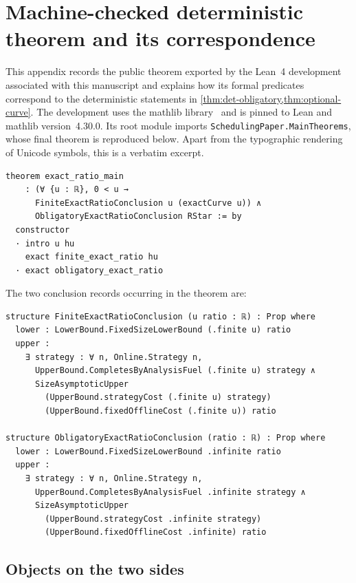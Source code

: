 \section{Machine-checked deterministic theorem and its correspondence}
\label{app:lean-formalization}

This appendix records the public theorem exported by the Lean~4
development~\cite{DeMouraUllrich2021} associated with this manuscript and
explains how its formal predicates correspond to the deterministic statements
in \cref{thm:det-obligatory,thm:optional-curve}.  The development uses the
mathlib library~\cite{Mathlib2020} and is pinned to Lean and mathlib
version~4.30.0.  Its root module imports
\texttt{SchedulingPaper.MainTheorems}, whose final theorem is reproduced
below.  Apart from the typographic rendering of Unicode symbols, this is a
verbatim excerpt.

\begin{lstlisting}[style=lean]
theorem exact_ratio_main
    : (∀ {u : ℝ}, 0 < u →
      FiniteExactRatioConclusion u (exactCurve u)) ∧
      ObligatoryExactRatioConclusion RStar := by
  constructor
  · intro u hu
    exact finite_exact_ratio hu
  · exact obligatory_exact_ratio
\end{lstlisting}

The two conclusion records occurring in the theorem are:

\begin{lstlisting}[style=lean]
structure FiniteExactRatioConclusion (u ratio : ℝ) : Prop where
  lower : LowerBound.FixedSizeLowerBound (.finite u) ratio
  upper :
    ∃ strategy : ∀ n, Online.Strategy n,
      UpperBound.CompletesByAnalysisFuel (.finite u) strategy ∧
      SizeAsymptoticUpper
        (UpperBound.strategyCost (.finite u) strategy)
        (UpperBound.fixedOfflineCost (.finite u)) ratio

structure ObligatoryExactRatioConclusion (ratio : ℝ) : Prop where
  lower : LowerBound.FixedSizeLowerBound .infinite ratio
  upper :
    ∃ strategy : ∀ n, Online.Strategy n,
      UpperBound.CompletesByAnalysisFuel .infinite strategy ∧
      SizeAsymptoticUpper
        (UpperBound.strategyCost .infinite strategy)
        (UpperBound.fixedOfflineCost .infinite) ratio
\end{lstlisting}

\subsection{Objects on the two sides}

